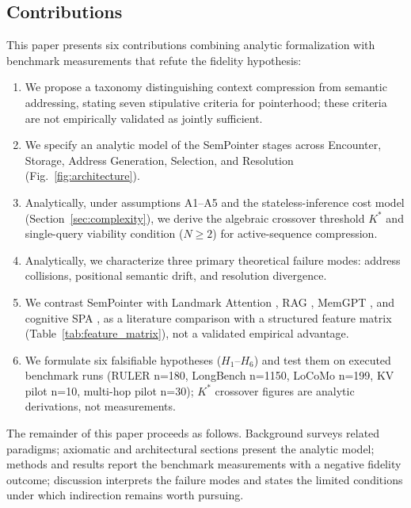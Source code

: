\documentclass[runningheads]{llncs}
\begin{document}
\subsection{Contributions}
This paper presents six contributions combining analytic formalization with benchmark measurements that refute the fidelity hypothesis:
\begin{enumerate}\setlength{\itemsep}{0.5pt}\setlength{\parsep}{0pt}\setlength{\parskip}{0pt}\setlength{\topsep}{1.5pt}
    \item We propose a taxonomy distinguishing context compression from semantic addressing, stating seven stipulative criteria for pointerhood; these criteria are not empirically validated as jointly sufficient.
    \item We specify an analytic model of the SemPointer stages across Encounter, Storage, Address Generation, Selection, and Resolution (Fig.~\ref{fig:architecture}).
    \item Analytically, under assumptions A1--A5 and the stateless-inference cost model (Section~\ref{sec:complexity}), we derive the algebraic crossover threshold $K^*$ and single-query viability condition ($N \ge 2$) for active-sequence compression.
    \item Analytically, we characterize three primary theoretical failure modes: address collisions, positional semantic drift, and resolution divergence.
    \item We contrast SemPointer with Landmark Attention \cite{mohtashami2023landmark}, RAG \cite{lewis2020rag, cheng2024xrag}, MemGPT \cite{packer2023memgpt}, and cognitive SPA \cite{eliasmith2013mind}, as a literature comparison with a structured feature matrix (Table~\ref{tab:feature_matrix}), not a validated empirical advantage.
    \item We formulate six falsifiable hypotheses ($H_1$--$H_6$) and test them on executed benchmark runs (RULER n=180, LongBench n=1150, LoCoMo n=199, KV pilot n=10, multi-hop pilot n=30); $K^*$ crossover figures are analytic derivations, not measurements.
\end{enumerate}

The remainder of this paper proceeds as follows. Background surveys related paradigms; axiomatic and architectural sections present the analytic model; methods and results report the benchmark measurements with a negative fidelity outcome; discussion interprets the failure modes and states the limited conditions under which indirection remains worth pursuing.
\end{document}
